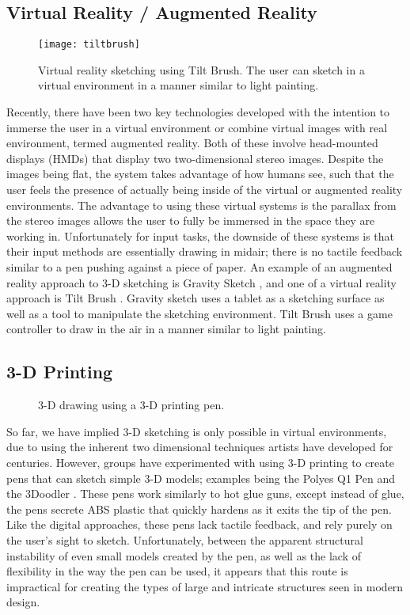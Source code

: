 \subsection{Virtual Reality / Augmented Reality}

\begin{figure}
\texttt{[image: tiltbrush]}
\caption[Virtual Reality Sketching using Tilt Brush]{Virtual reality sketching using Tilt Brush. The user can sketch in a virtual environment in a manner similar to light painting.}
\end{figure}

Recently, there have been two key technologies developed with the intention to immerse the user in a virtual environment or combine virtual images with real environment, termed augmented reality. 
Both of these involve head-mounted displays (HMDs) that display two two-dimensional stereo images.
Despite the images being flat, the system takes advantage of how humans see, such that the user feels the presence of actually being inside of the virtual or augmented reality environments.
The advantage to using these virtual systems is the parallax from the stereo images allows the user to fully be immersed in the space they are working in.
Unfortunately for input tasks, the downside of these systems is that their input methods are essentially drawing in midair; there is no tactile feedback similar to a pen pushing against a piece of paper.
An example of an augmented reality approach to 3-D sketching is Gravity Sketch \autocite{gravitysketch}, and one of a virtual reality approach is Tilt Brush \autocite{tiltbrush}.
Gravity sketch uses a tablet as a sketching surface as well as a tool to manipulate the sketching environment.
Tilt Brush uses a game controller to draw in the air in a manner similar to light painting.

\subsection{3-D Printing}

\begin{figure}
\caption[3D-Drawing using a 3-D Printing Pen]
{3-D drawing using a 3-D printing pen. \autocite{polyes}}
\end{figure}

So far, we have implied 3-D sketching is only possible in virtual environments, due to using the inherent two dimensional techniques artists have developed for centuries.  
However, groups have experimented with using 3-D printing to create pens that can sketch simple 3-D models; examples being the Polyes Q1 Pen \autocite{polyes} and the 3Doodler \autocite{3doodler}.
These pens work similarly to hot glue guns, except instead of glue, the pens secrete ABS plastic that quickly hardens as it exits the tip of the pen.
Like the digital approaches, these pens lack tactile feedback, and rely purely on the user's sight to sketch.
Unfortunately, between the apparent structural instability of even small models created by the pen, as well as the lack of flexibility in the way the pen can be used, it appears that this route is impractical for creating the types of large and intricate structures seen in modern design.